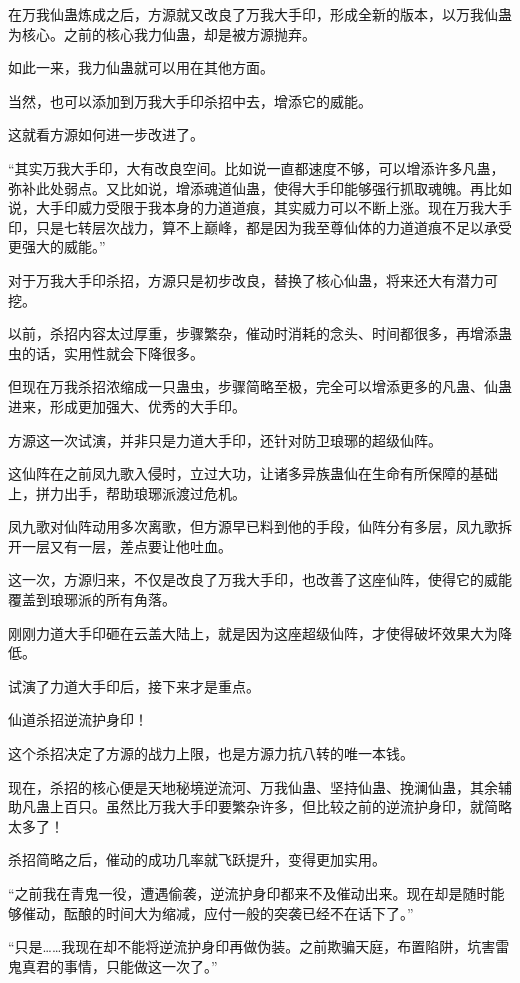 \begin{this_body}
在万我仙蛊炼成之后，方源就又改良了万我大手印，形成全新的版本，以万我仙蛊为核心。之前的核心我力仙蛊，却是被方源抛弃。

如此一来，我力仙蛊就可以用在其他方面。

当然，也可以添加到万我大手印杀招中去，增添它的威能。

这就看方源如何进一步改进了。

“其实万我大手印，大有改良空间。比如说一直都速度不够，可以增添许多凡蛊，弥补此处弱点。又比如说，增添魂道仙蛊，使得大手印能够强行抓取魂魄。再比如说，大手印威力受限于我本身的力道道痕，其实威力可以不断上涨。现在万我大手印，只是七转层次战力，算不上巅峰，都是因为我至尊仙体的力道道痕不足以承受更强大的威能。”

对于万我大手印杀招，方源只是初步改良，替换了核心仙蛊，将来还大有潜力可挖。

以前，杀招内容太过厚重，步骤繁杂，催动时消耗的念头、时间都很多，再增添蛊虫的话，实用性就会下降很多。

但现在万我杀招浓缩成一只蛊虫，步骤简略至极，完全可以增添更多的凡蛊、仙蛊进来，形成更加强大、优秀的大手印。

方源这一次试演，并非只是力道大手印，还针对防卫琅琊的超级仙阵。

这仙阵在之前凤九歌入侵时，立过大功，让诸多异族蛊仙在生命有所保障的基础上，拼力出手，帮助琅琊派渡过危机。

凤九歌对仙阵动用多次离歌，但方源早已料到他的手段，仙阵分有多层，凤九歌拆开一层又有一层，差点要让他吐血。

这一次，方源归来，不仅是改良了万我大手印，也改善了这座仙阵，使得它的威能覆盖到琅琊派的所有角落。

刚刚力道大手印砸在云盖大陆上，就是因为这座超级仙阵，才使得破坏效果大为降低。

试演了力道大手印后，接下来才是重点。

仙道杀招逆流护身印！

这个杀招决定了方源的战力上限，也是方源力抗八转的唯一本钱。

现在，杀招的核心便是天地秘境逆流河、万我仙蛊、坚持仙蛊、挽澜仙蛊，其余辅助凡蛊上百只。虽然比万我大手印要繁杂许多，但比较之前的逆流护身印，就简略太多了！

杀招简略之后，催动的成功几率就飞跃提升，变得更加实用。

“之前我在青鬼一役，遭遇偷袭，逆流护身印都来不及催动出来。现在却是随时能够催动，酝酿的时间大为缩减，应付一般的突袭已经不在话下了。”

“只是……我现在却不能将逆流护身印再做伪装。之前欺骗天庭，布置陷阱，坑害雷鬼真君的事情，只能做这一次了。”


\end{this_body}
